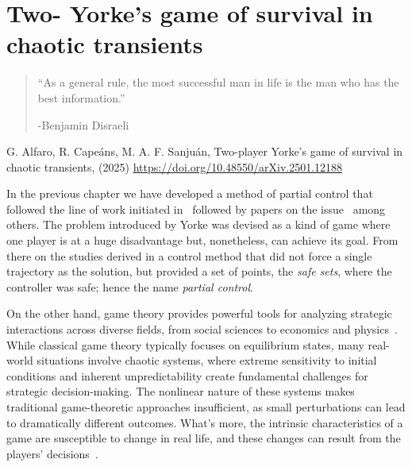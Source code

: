 \chapter{Two- Yorke's game of survival in chaotic transients} %
\label{chap:PartialControlGame}


\begin{quotation}

	\vspace{-3cm}
	\begin{flushright}
    \begin{minipage}[t][5cm][b]{0.5\textwidth}
    { ``As a general rule, the most successful man in life is the man who has the best information.''}
    
    \bigskip
    
    -{\small  Benjamin Disraeli}
    \end{minipage}
    \end{flushright}



    \vspace{0.5cm}

\end{quotation}

G. Alfaro, R. Capeáns, M. A. F. Sanjuán,
Two-player Yorke's game of survival in chaotic transients,
(2025)
\url{https://doi.org/10.48550/arXiv.2501.12188}


In the previous chapter we have developed a method of partial control that followed the line of work initiated in~\cite{Yorke} followed by papers on the issue~\cite{DynamicsPartialControl,PartialControlBeyond,PartialControlFunctions} among others. The problem introduced by Yorke was devised as a kind of game where one player is at a huge disadvantage but, nonetheless, can achieve its goal. From there on the studies derived in a control method that did not force a single trajectory as the solution, but provided a set of points, the \textit{safe sets}, where the controller was safe; hence the name \textit{partial control}.

On the other hand, game theory provides powerful tools for analyzing strategic interactions across diverse fields, from social sciences to economics and physics~\cite{Social,EconomyGames,GamesComplex}. While classical game theory typically focuses on equilibrium states, many real-world situations involve chaotic systems, where extreme sensitivity to initial conditions and inherent unpredictability create fundamental challenges for strategic decision-making. The nonlinear nature of these systems makes traditional game-theoretic approaches insufficient, as small perturbations can lead to dramatically different outcomes. What's more, the intrinsic characteristics of a game are susceptible to change in real life, and these changes can result from the players' decisions~\cite{AkiyamaKaneko1,AkiyamaKaneko2}.

